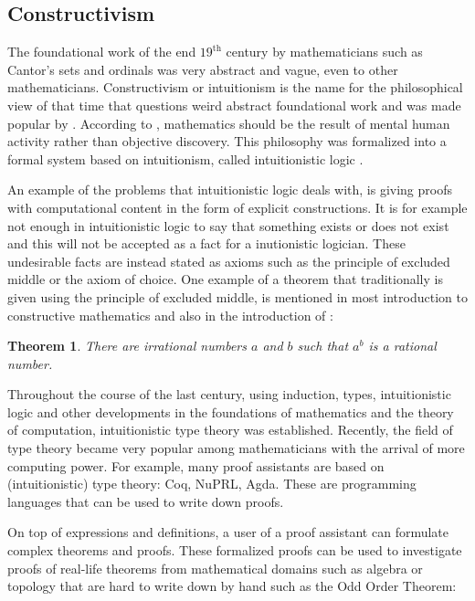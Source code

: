 \documentclass[12pt,a4paper,twoside,xetex,draft]{book}
\newtheorem{theorem}{Theorem}[section]
\begin{document}
\subsection{Constructivism}\label{constructivism}

The foundational work of the end $19^{\text{th}}$ century by mathematicians such as Cantor's sets and ordinals was very abstract and vague, even to other mathematicians. Constructivism or intuitionism is the name for the philosophical view of that time that questions weird abstract foundational work and was made popular by \cite{Brouwer1905}. According to \cite{Brouwer1905}, mathematics should be the result of mental human activity rather than objective discovery. This philosophy was formalized into a formal system based on intuitionism, called intuitionistic logic \cite{Heyting1930}. 

An example of the problems  that intuitionistic logic deals with, is giving proofs with computational content in the form of explicit constructions. It is for example not enough in intuitionistic logic to say that something exists or does not exist and this will not be accepted as a fact for a inutionistic logician. These undesirable facts are instead stated as axioms such as the principle of excluded middle or the axiom of choice. One example of a theorem that traditionally is given using the principle of excluded middle, is mentioned in most introduction to constructive mathematics and also in the introduction of \cite{Palmgren2014}:

\begin{theorem}
  There are irrational numbers $a$ and $b$ such that $a^b$ is a rational number.
\end{theorem} 

Throughout the course of the last century, using induction, types, intuitionistic logic and other developments in the foundations of mathematics and the theory of computation, intuitionistic type theory \cite{Loef1975} was established. Recently, the field of type theory became very popular among mathematicians with the arrival of more computing power. For example, many proof assistants are based on (intuitionistic) type theory: Coq, NuPRL, Agda. These are programming languages that can be used to write down proofs.

On top of expressions and definitions, a user of a proof assistant can formulate complex theorems and proofs. These formalized proofs can be used to investigate proofs of real-life theorems from mathematical domains such as algebra or topology that are hard to write down by hand such as the Odd Order Theorem:
\end{document}
